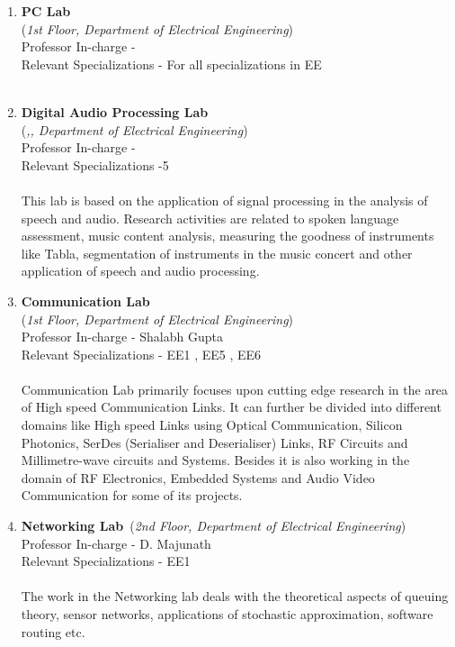 \documentclass[openany]{book} %
\begin{document}
\begin{enumerate}
\item  \textbf{PC Lab}\\
    (\textit{1st Floor, Department of Electrical Engineering})\\
    Professor In-charge - \\
Relevant Specializations - For all specializations in EE\\
\\


\item  \textbf{Digital Audio Processing Lab}\\
    (\textit{,, Department of Electrical Engineering})\\
    Professor In-charge - \\
Relevant Specializations -5\\
\\
This lab is based on the application of signal processing in the analysis of speech and audio. Research activities are related to spoken language assessment, music content analysis, measuring the goodness of instruments like Tabla, segmentation of instruments in the music concert and other application of speech and audio processing.\\




\item \textbf{Communication Lab}\\
    (\textit{1st Floor, Department of Electrical Engineering})\\
    Professor In-charge - Shalabh Gupta\\
Relevant Specializations - EE1 , EE5 , EE6\\
\\
Communication Lab primarily focuses upon cutting 
edge research in the area of High speed Communication 
Links. It can further be divided into different domains like  High speed Links using Optical Communication, 
Silicon Photonics, SerDes (Serialiser and Deserialiser) Links, RF Circuits and Millimetre-wave circuits and Systems.  Besides it is also working in the domain of RF Electronics,  Embedded Systems and Audio Video Communication for some of its projects.\\

\item  \textbf{Networking Lab}\
    (\textit{2nd Floor, Department of Electrical Engineering})\\
    Professor In-charge - D. Majunath\\
Relevant Specializations - EE1\\
\\
The work in the Networking lab deals with the theoretical aspects of queuing theory, sensor networks, applications of stochastic approximation, software routing etc. \\


\end{enumerate}
\end{document}
